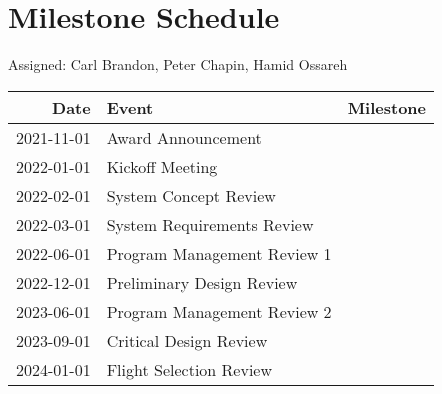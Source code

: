 \section{Milestone Schedule}
Assigned: Carl Brandon, Peter Chapin, Hamid Ossareh

\begin{tabular}{rll}
\hline
Date & Event & Milestone\\
\hline
2021-11-01 & Award Announcement & \\
2022-01-01 & Kickoff Meeting & \\
2022-02-01 & System Concept Review & \\
2022-03-01 & System Requirements Review & \\
2022-06-01 & Program Management Review 1 & \\
2022-12-01 & Preliminary Design Review & \\
2023-06-01 & Program Management Review 2 & \\
2023-09-01 & Critical Design Review & \\
2024-01-01 & Flight Selection Review & \\
\hline
\end{tabular}
